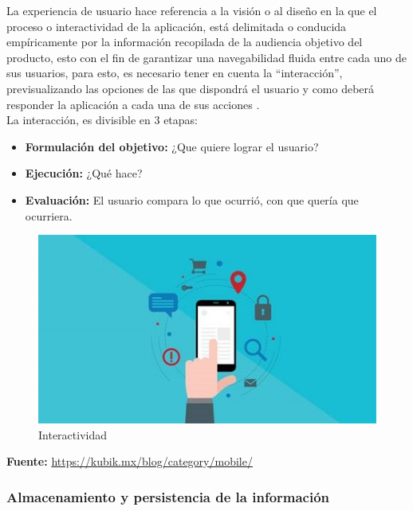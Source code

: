 		{La experiencia de usuario hace referencia a la visión o al diseño en la que el proceso o interactividad de la aplicación, está delimitada o conducida empíricamente por la información recopilada de la audiencia objetivo del producto, esto con el fin de garantizar una navegabilidad fluida entre cada uno de sus usuarios, para esto, es necesario tener en cuenta la “interacción”, previsualizando las opciones de las que dispondrá el usuario y como deberá responder la aplicación a cada una de sus acciones \cite{YusefUX}.\\
		
		La interacción, es divisible en 3 etapas:
		
		\begin{itemize}
			\item \textbf{Formulación del objetivo:} ¿Que quiere lograr el usuario?
			\item \textbf{Ejecución:} ¿Qué hace?
			\item \textbf{Evaluación:} El usuario compara lo que ocurrió, con que quería que ocurriera.
		\end{itemize}
		
		\begin{figure}[H]
			\centering
			\includegraphics[width=0.8\linewidth]{description/framework/interactividad.jpg}
			\caption{Interactividad}
		\end{figure}
		\begin{center}
			\textbf{Fuente:} \url{https://kubik.mx/blog/category/mobile/}
		\end{center}
		}
	
		\subsubsection{Almacenamiento y persistencia de la información}
		
